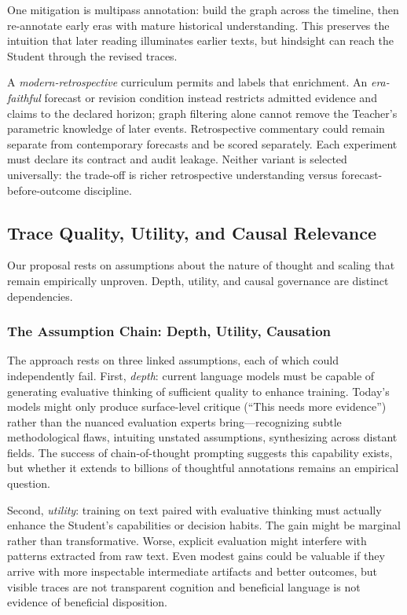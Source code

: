 One mitigation is multipass annotation: build the graph across the timeline, then re-annotate early eras with mature historical understanding. This preserves the intuition that later reading illuminates earlier texts, but hindsight can reach the Student through the revised traces.

A \emph{modern-retrospective} curriculum permits and labels that enrichment. An \emph{era-faithful} forecast or revision condition instead restricts admitted evidence and claims to the declared horizon; graph filtering alone cannot remove the Teacher's parametric knowledge of later events. Retrospective commentary could remain separate from contemporary forecasts and be scored separately. Each experiment must declare its contract and audit leakage. Neither variant is selected universally: the trade-off is richer retrospective understanding versus forecast-before-outcome discipline.


\subsection{Trace Quality, Utility, and Causal Relevance}

Our proposal rests on assumptions about the nature of thought and scaling that remain empirically unproven. Depth, utility, and causal governance are distinct dependencies.

\subsubsection{The Assumption Chain: Depth, Utility, Causation}

The approach rests on three linked assumptions, each of which could independently fail. First, \emph{depth}: current language models must be capable of generating evaluative thinking of sufficient quality to enhance training. Today's models might only produce surface-level critique (``This needs more evidence'') rather than the nuanced evaluation experts bring---recognizing subtle methodological flaws, intuiting unstated assumptions, synthesizing across distant fields. The success of chain-of-thought prompting suggests this capability exists, but whether it extends to billions of thoughtful annotations remains an empirical question.

Second, \emph{utility}: training on text paired with evaluative thinking must
actually enhance the Student's capabilities or decision habits. The gain might
be marginal rather than transformative. Worse, explicit evaluation might
interfere with patterns extracted from raw text. Even modest gains could be
valuable if they arrive with more inspectable intermediate artifacts and better
outcomes, but visible traces are not transparent cognition and beneficial
language is not evidence of beneficial disposition.

